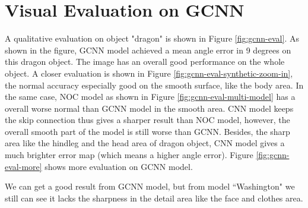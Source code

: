 \section{Visual Evaluation on GCNN}
A qualitative evaluation on object "dragon" is shown in Figure \ref{fig:gcnn-eval}. As shown in the figure, GCNN model achieved a mean angle error in 9 degrees on this dragon object. The image has an overall good performance on the whole object. A closer evaluation is shown in Figure \ref{fig:gcnn-eval-synthetic-zoom-in}, the normal accuracy especially good on the smooth surface, like the body area. In the same case, NOC model as shown in Figure \ref{fig:gcnn-eval-multi-model} has a overall worse normal than GCNN model in the smooth area. CNN model keeps the skip connection thus gives a sharper result than NOC model, however, the overall smooth part of the model is still worse than GCNN. Besides, the sharp area like the hindleg and the head area of dragon object, CNN model gives a much brighter error map (which means a higher angle error). Figure \ref{fig:gcnn-eval-more} shows more evaluation on GCNN model.

We can get a good result from GCNN model, but from model ``Washington" we still can see it lacks the sharpness in the detail area like the face and clothes area. 



